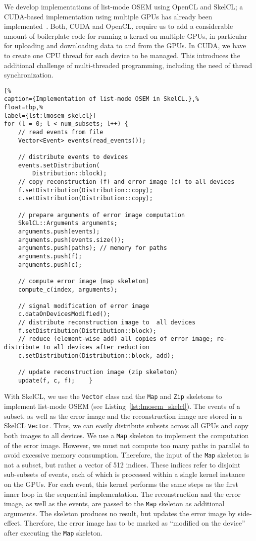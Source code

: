 We develop implementations of list-mode OSEM using OpenCL and SkelCL; a CUDA-based implementation using multiple GPUs has already been implemented~\cite{ScVG-08}.
Both, CUDA and OpenCL, require us to add a considerable amount of boilerplate code for running a kernel on multiple GPUs, in particular for uploading and downloading data to and from the GPUs.
In CUDA, we have to create one CPU thread for each device to be managed.
This introduces the additional challenge of multi-threaded programming, including the need of thread synchronization.

\begin{lstlisting}[%
caption={Implementation of list-mode OSEM in SkelCL.},%
float=tbp,%
label={lst:lmosem_skelcl}]
for (l = 0; l < num_subsets; l++) {
	// read events from file
	Vector<Event> events(read_events());
	
	// distribute events to devices
	events.setDistribution(
		Distribution::block);
	// copy reconstruction (f) and error image (c) to all devices
	f.setDistribution(Distribution::copy);
	c.setDistribution(Distribution::copy);
	
	// prepare arguments of error image computation
	SkelCL::Arguments arguments;
	arguments.push(events);
	arguments.push(events.size());
	arguments.push(paths); // memory for paths
	arguments.push(f);
	arguments.push(c);
	
	// compute error image (map skeleton)
	compute_c(index, arguments);
	
	// signal modification of error image
	c.dataOnDevicesModified();
	// distribute reconstruction image to  all devices
	f.setDistribution(Distribution::block);
	// reduce (element-wise add) all copies of error image; re-distribute to all devices after reduction
	c.setDistribution(Distribution::block, add);
	
	// update reconstruction image (zip skeleton)
	update(f, c, f);	}
\end{lstlisting}

With SkelCL, we use the \texttt{Vector} class and the \texttt{Map} and \texttt{Zip} skeletons to implement list-mode OSEM (see Listing~\ref{lst:lmosem_skelcl}).
The events of a subset, as well as the error image and the reconstruction image are stored in a SkelCL \texttt{Vector}.
Thus, we can easily distribute subsets across all GPUs and copy both images to all devices.
We use a \texttt{Map} skeleton to implement the computation of the error image.
However, we must not compute too many paths in parallel to avoid excessive memory consumption.
Therefore, the input of the \texttt{Map} skeleton is not a subset, but rather a vector of 512 indices.
These indices refer to disjoint sub-subsets of events, each of which is processed within a single kernel instance on the GPUs.
For each event, this kernel performs the same steps as the first inner loop in the sequential implementation.
The reconstruction and the error image, as well as the events, are passed to the \texttt{Map} skeleton as additional arguments.
The skeleton produces no result, but updates the error image by side-effect.
Therefore, the error image has to be marked as ``modified on the device'' after executing the \texttt{Map} skeleton.

